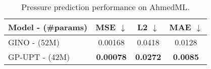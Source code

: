 \begin{table}[t!]
\centering
\caption{Pressure prediction performance on AhmedML.}
\begin{tabular}{@{}lccc}
\toprule
Model - (\#params)& MSE $\downarrow$ & L2 $\downarrow$ & MAE $\downarrow$ \\ \hline
GINO - (52M) & 0.00168                     & 0.0418                      & 0.0128         \\
GP-UPT - (42M) & \textbf{0.00078} & \textbf{0.0272}  & \textbf{0.0085} \\                
\bottomrule
\end{tabular}
\label{tab:ahmedml}
\end{table}
